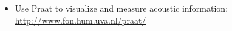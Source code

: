 \begin{itemize}
  \item Use Praat to visualize and measure acoustic information: \url{http://www.fon.hum.uva.nl/praat/}
\end{itemize}
